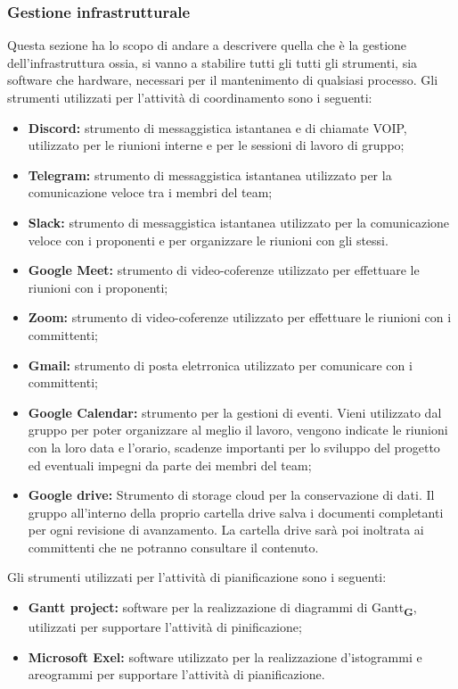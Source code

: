 \subsubsection{Gestione infrastrutturale}
Questa sezione ha lo scopo di andare a descrivere quella che è la gestione dell'infrastruttura ossia, si vanno a stabilire tutti gli tutti gli strumenti, sia software che hardware, necessari per il mantenimento di qualsiasi processo.
Gli strumenti utilizzati per l'attività di coordinamento sono i seguenti:
\begin{itemize}
    \item \textbf{Discord:} strumento di messaggistica istantanea e di chiamate VOIP, utilizzato per le riunioni interne e per le sessioni di lavoro di gruppo;
    \item \textbf{Telegram:} strumento di messaggistica istantanea utilizzato per la comunicazione veloce tra i membri del team;
    \item \textbf{Slack:} strumento di messaggistica istantanea utilizzato per la comunicazione veloce con i proponenti e per organizzare le riunioni con gli stessi.
    \item \textbf{Google Meet:} strumento di video-coferenze utilizzato per effettuare le riunioni con i proponenti;
    \item \textbf{Zoom:} strumento di video-coferenze utilizzato per effettuare le riunioni con i committenti;
    \item \textbf{Gmail:} strumento di posta eletrronica utilizzato per comunicare con i committenti;
    \item \textbf{Google Calendar:} strumento per la gestioni di eventi. Vieni utilizzato dal gruppo per poter organizzare al meglio il lavoro, vengono indicate le riunioni con la loro data e l'orario, scadenze importanti per lo sviluppo del progetto ed eventuali impegni da parte dei membri del team;
    \item \textbf{Google drive:} Strumento di storage cloud per la conservazione di dati. Il gruppo all'interno della proprio cartella drive salva i documenti completanti per ogni revisione di avanzamento. La cartella drive sarà poi inoltrata ai committenti che ne potranno consultare il contenuto.
\end{itemize}
Gli strumenti utilizzati per l'attività di pianificazione sono i seguenti:
\begin{itemize}
    \item \textbf{Gantt project:} software per la realizzazione di diagrammi di Gantt\textsubscript{\textbf{G}}, utilizzati per supportare l'attività di pinificazione;
    \item \textbf{Microsoft Exel:} software utilizzato per la realizzazione d'istogrammi e areogrammi per supportare l'attività di pianificazione.
\end{itemize}
